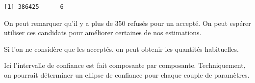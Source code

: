 \documentclass[]{article}
\newenvironment{Shaded}{\begin{snugshade}}{\end{snugshade}}
\newcommand{\CommentTok}[1]{\textcolor[rgb]{0.56,0.35,0.01}{\textit{#1}}}
\newcommand{\DataTypeTok}[1]{\textcolor[rgb]{0.13,0.29,0.53}{#1}}
\newcommand{\DecValTok}[1]{\textcolor[rgb]{0.00,0.00,0.81}{#1}}
\newcommand{\FloatTok}[1]{\textcolor[rgb]{0.00,0.00,0.81}{#1}}
\newcommand{\KeywordTok}[1]{\textcolor[rgb]{0.13,0.29,0.53}{\textbf{#1}}}
\newcommand{\NormalTok}[1]{#1}
\newcommand{\OperatorTok}[1]{\textcolor[rgb]{0.81,0.36,0.00}{\textbf{#1}}}
\newcommand{\StringTok}[1]{\textcolor[rgb]{0.31,0.60,0.02}{#1}}
\newenvironment{Correction}%
  { \vspace{\baselineskip}\begin{mdframed}[backgroundcolor=my_green]}%
  {\end{mdframed}}
\begin{document}
\begin{Shaded}
\end{Shaded}

\begin{verbatim}
[1] 386425      6
\end{verbatim}

\begin{Correction}
On peut remarquer qu'il y a plus de 350 refusés pour un accepté. On peut espérer utiliser ces candidats pour améliorer certaines de nos estimations.

Si l'on ne considère que les acceptés, on peut obtenir les quantités habituelles.

Ici l'intervalle de confiance est fait composante par composante. Techniquement, on pourrait déterminer un ellipse de confiance pour chaque couple de paramètres.
\end{Correction}
\end{document}

